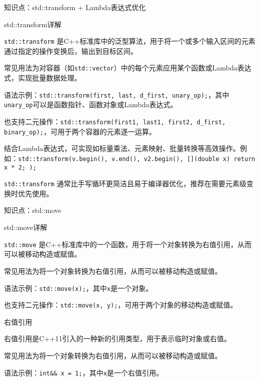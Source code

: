 \documentclass[UTF8,aspectratio=169]{beamer}
\begin{document}
\begin{frame}{知识点：std::transform + Lambda表达式优化}
    \begin{ytublock}{std::transform详解}
        \item \texttt{std::transform} 是C++标准库中的泛型算法，用于将一个或多个输入区间的元素通过指定的操作变换后，输出到目标区间。
        \item 常见用法为对容器（如\texttt{std::vector}）中的每个元素应用某个函数或Lambda表达式，实现批量数据处理。
        \item 语法示例：\texttt{std::transform(first, last, d\_first, unary\_op);}，其中\texttt{unary\_op}可以是函数指针、函数对象或Lambda表达式。
        \item 也支持二元操作：\texttt{std::transform(first1, last1, first2, d\_first, binary\_op);}，可用于两个容器的元素逐一运算。
        \item 结合Lambda表达式，可实现如标量乘法、元素映射、批量转换等高效操作。例如：\texttt{std::transform(v.begin(), v.end(), v2.begin(), [](double x){ return x * 2; });}
        \item \texttt{std::transform} 通常比手写循环更简洁且易于编译器优化，推荐在需要元素级变换时优先使用。
    \end{ytublock}
\end{frame}

\begin{frame}{知识点：std::move}
    \begin{ytublock}{std::move详解}
        \item \texttt{std::move} 是C++标准库中的一个函数，用于将一个对象转换为右值引用，从而可以被移动构造或赋值。
        \item 常见用法为将一个对象转换为右值引用，从而可以被移动构造或赋值。
        \item 语法示例：\texttt{std::move(x);}，其中\texttt{x}是一个对象。
        \item 也支持二元操作：\texttt{std::move(x, y);}，可用于两个对象的移动构造或赋值。
    \end{ytublock}
    \begin{ytublock}{右值引用}
        \item 右值引用是C++11引入的一种新的引用类型，用于表示临时对象或右值。
        \item 常见用法为将一个对象转换为右值引用，从而可以被移动构造或赋值。
        \item 语法示例：\texttt{int&& x = 1;}，其中\texttt{x}是一个右值引用。
    \end{ytublock}
\end{frame}
\end{document}
